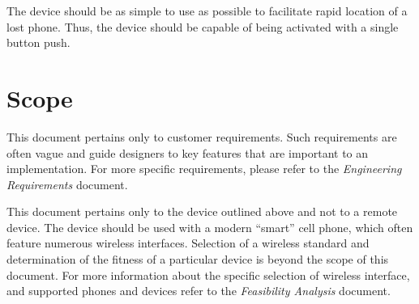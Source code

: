\documentclass[twoside]{article}
\begin{document}
The device should be as simple to use as possible to facilitate rapid location of a lost phone.  Thus, the device should be capable of being activated with a single button push.



\section{Scope}

This document pertains only to customer requirements.  Such requirements are often vague and guide designers to key features that are important to an implementation.  For more specific requirements, please refer to the \emph{Engineering Requirements} document.

This document pertains only to the device outlined above and not to a remote device.  The device should be used with a modern ``smart'' cell phone, which often feature numerous wireless interfaces.  Selection of a wireless standard and determination of the fitness of a particular device is beyond the scope of this document.  For more information about the specific selection of wireless interface, and supported phones and devices refer to the \emph{Feasibility Analysis} document.


\end{document}
